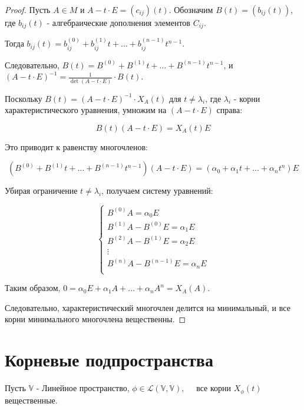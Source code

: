 \clearpage
\begin{proof}

    Пусть \( A \in M \) и \( A - t \cdot E = (c_{ij})(t) \). Обозначим \( B(t) = (b_{ij}(t)) \), где \( b_{ij}(t) \) - алгебраические дополнения элементов \( C_{ij} \).

    Тогда \( b_{ij}(t) = b_{ij}^{(0)} + b_{ij}^{(1)} t + \ldots + b_{ij}^{(n-1)} t^{n-1} \).

    Следовательно, \( B(t) = B^{(0)} + B^{(1)} t + \ldots + B^{(n-1)} t^{n-1} \), и \((A - t \cdot E)^{-1} = \frac{1}{\det(A - t \cdot E)} \cdot B(t) \).

    Поскольку \( B(t) = (A - t \cdot E)^{-1} \cdot X_{A}(t) \) для \( t \neq \lambda_{i} \), где \( \lambda_{i} \) - корни характеристического уравнения, умножим на \( (A - t \cdot E) \) справа:

    \[
    B(t)(A - t \cdot E) = X_{A}(t) E
    \]

    Это приводит к равенству многочленов:

    \[
    (B^{(0)} + B^{(1)} t + \ldots + B^{(n-1)} t^{n-1})(A - t \cdot E) = (\alpha_{0} + \alpha_{1} t + \ldots + \alpha_{n} t^n) E
    \]

    Убирая ограничение \( t \neq \lambda_{i} \), получаем систему уравнений:

    \[
    \begin{cases}
        B^{(0)} A = \alpha_{0} E \\
        B^{(1)} A - B^{(0)} E = \alpha_{1} E \\
        B^{(2)} A - B^{(1)} E = \alpha_{2} E \\
        \vdots \\
        B^{(n)} A - B^{(n-1)} E = \alpha_{n} E \\
    \end{cases}
    \]

    Таким образом, \( 0 = \alpha_{0} E + \alpha_{1} A + \ldots + \alpha_{n} A^n = X_{A}(A) \).

    Следовательно, характеристический многочлен делится на минимальный, и все корни минимального многочлена вещественны.
\end{proof}

\section{Корневые подпространства}

Пусть \( \mathbb{V} \) - Линейное пространство, \(\phi \in \mathcal{L}(\mathbb{V}, \mathbb{V}), \quad  \) все корни \(X_{\phi}(t)\) вещественные.


